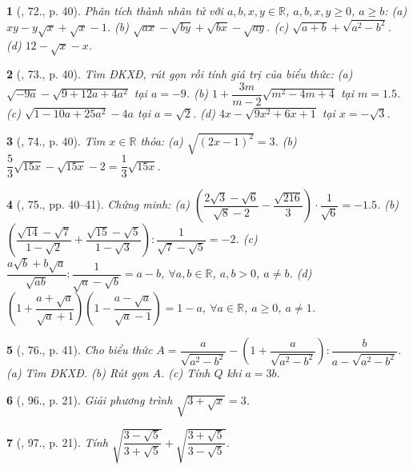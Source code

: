 \documentclass{article}
\newtheorem{baitoan}{}%
\begin{document}
\begin{baitoan}[\cite{SGK_Toan_9_tap_1}, 72., p. 40]
	Phân tích thành nhân tử với $a,b,x,y\in\mathbb{R}$, $a,b,x,y\ge0$, $a\ge b$: (a) $xy - y\sqrt{x} + \sqrt{x} - 1$. (b) $\sqrt{ax} - \sqrt{by} + \sqrt{bx} - \sqrt{ay}$. (c) $\sqrt{a + b} + \sqrt{a^2 - b^2}$. (d) $12 - \sqrt{x} - x$.
\end{baitoan}

\begin{baitoan}[\cite{SGK_Toan_9_tap_1}, 73., p. 40]
	Tìm ĐKXĐ, rút gọn rồi tính giá trị của biểu thức: (a) $\sqrt{-9a} - \sqrt{9 + 12a + 4a^2}$ tại $a = -9$. (b) $1 + \dfrac{3m}{m - 2}\sqrt{m^2 - 4m + 4}$ tại $m = 1.5$. (c) $\sqrt{1 - 10a + 25a^2} - 4a$ tại $a = \sqrt{2}$. (d) $4x - \sqrt{9x^2 + 6x + 1}$ tại $x = -\sqrt{3}$.
\end{baitoan}

\begin{baitoan}[\cite{SGK_Toan_9_tap_1}, 74., p. 40]
	Tìm $x\in\mathbb{R}$ thỏa: (a) $\sqrt{(2x - 1)^2} = 3$. (b) $\dfrac{5}{3}\sqrt{15x} - \sqrt{15x} - 2 = \dfrac{1}{3}\sqrt{15x}$.
\end{baitoan}

\begin{baitoan}[\cite{SGK_Toan_9_tap_1}, 75., pp. 40--41]
	Chứng minh: (a) $\left(\dfrac{2\sqrt{3} - \sqrt{6}}{\sqrt{8} - 2} - \dfrac{\sqrt{216}}{3}\right)\cdot\dfrac{1}{\sqrt{6}} = -1.5$. (b) $\left(\dfrac{\sqrt{14} - \sqrt{7}}{1 - \sqrt{2}} + \dfrac{\sqrt{15} - \sqrt{5}}{1 - \sqrt{3}}\right):\dfrac{1}{\sqrt{7} - \sqrt{5}} = -2$. (c) $\dfrac{a\sqrt{b} + b\sqrt{a}}{\sqrt{ab}}:\dfrac{1}{\sqrt{a} - \sqrt{b}} = a - b$, $\forall a,b\in\mathbb{R}$, $a,b > 0$, $a\ne b$. (d) $\left(1 + \dfrac{a + \sqrt{a}}{\sqrt{a} + 1}\right)\left(1 - \dfrac{a - \sqrt{a}}{\sqrt{a} - 1}\right) = 1 - a$, $\forall a\in\mathbb{R}$, $a\ge0$, $a\ne1$.
\end{baitoan}

\begin{baitoan}[\cite{SGK_Toan_9_tap_1}, 76., p. 41]
	Cho biểu thức $A = \dfrac{a}{\sqrt{a^2 - b^2}} - \left(1 + \dfrac{a}{\sqrt{a^2 - b^2}}\right):\dfrac{b}{a - \sqrt{a^2 - b^2}}$. (a) Tìm ĐKXĐ. (b) Rút gọn $A$. (c) Tính $Q$ khi $a = 3b$.
\end{baitoan}

\begin{baitoan}[\cite{SBT_Toan_9_tap_1}, 96., p. 21]
	Giải phương trình $\sqrt{3 + \sqrt{x}} = 3$.
\end{baitoan}

\begin{baitoan}[\cite{SBT_Toan_9_tap_1}, 97., p. 21]
	Tính $\sqrt{\dfrac{3 - \sqrt{5}}{3 + \sqrt{5}}} + \sqrt{\dfrac{3 + \sqrt{5}}{3 - \sqrt{5}}}$.
\end{baitoan}
\end{document}

